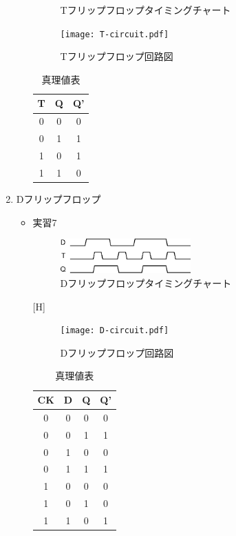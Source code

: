 \documentclass[dvipdfmx]{jsarticle}
\begin{document}
\begin{enumerate}
\begin{itemize}
\begin{figure}[H]
							\caption{Tフリップフロップタイミングチャート}
						\end{figure}
						\begin{figure}
							\center
							\texttt{[image: T-circuit.pdf]}
							\caption{Tフリップフロップ回路図}
						\end{figure}
						\begin{table}[H]
							\center
							\caption{真理値表}
							\begin{tabular}{|c|c|c|}
								\hline
								T & Q & Q' \\ \hline
								0 & 0 & 0 \\ \hline
								0 & 1 & 1 \\ \hline
								1 & 0 & 1 \\ \hline
								1 & 1 & 0 \\ \hline
							\end{tabular}
						\end{table}
				\end{itemize}
			\item Dフリップフロップ
				\begin{itemize}
					\item 実習7
						\begin{figure}[H]
							\center
							\includegraphics[width=5cm]{d.eps}
							\caption{Dフリップフロップタイミングチャート}
						\end{figure}[H]
						\begin{figure}[H]
							\center
							\texttt{[image: D-circuit.pdf]}
							\caption{Dフリップフロップ回路図}
						\end{figure}
						\begin{table}[H]
							\center
							\caption{真理値表}
							\begin{tabular}{|c|c|c|c|}
								\hline
								CK & D & Q & Q' \\ \hline
								0 & 0 & 0 & 0 \\ \hline
								0 & 0 & 1 & 1 \\ \hline
								0 & 1 & 0 & 0 \\ \hline
								0 & 1 & 1 & 1 \\ \hline
								1 & 0 & 0 & 0 \\ \hline
								1 & 0 & 1 & 0 \\ \hline
								1 & 1 & 0 & 1 \\ \hline

\end{tabular}
\end{table}
\end{itemize}
\end{enumerate}
\end{document}
